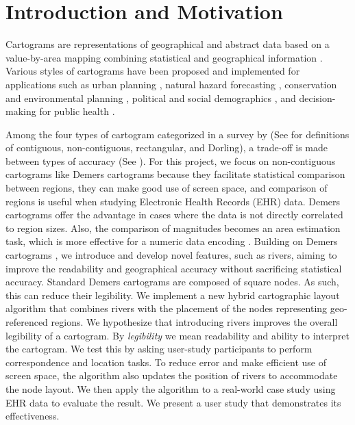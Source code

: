 \section{Introduction and Motivation}

Cartograms are representations of geographical and abstract data based on a value-by-area mapping combining statistical and geographical information \cite{dent2009Cartography,inoue2011New}. 
Various styles of cartograms have been proposed and implemented for applications such as urban planning \cite{harris2018Mapping, arranz-lopez2021Enduser}, natural hazard forecasting \cite{pappenberger2019Cartograms, park2020Flood}, conservation and environmental planning \cite{galluzzi2018Mapping, rocchini2019Cartogramming}, political and social demographics \cite{breitzman2018Using, alieva2021How}, and decision-making for public health \cite{gao2020Visualising, sack2021Visualizing}.

Among the four types of cartogram categorized in a survey by  (See  for definitions of contiguous, non-contiguous, rectangular, and Dorling), a trade-off is made between types of accuracy (See ).
For this project, we focus on non-contiguous cartograms like Demers cartograms because they facilitate statistical comparison between regions, they can make good use of screen space, and comparison of regions is useful when studying Electronic Health Records (EHR) data.
Demers cartograms offer the advantage in cases where the data is not directly correlated to region sizes. Also, the comparison of magnitudes becomes an area estimation task, which is more effective for a numeric data encoding \cite{munzner2014Visualization}.
Building on Demers cartograms \cite{ian2002Cartogram}, we introduce and develop novel features, such as rivers, aiming to improve the readability and geographical accuracy without sacrificing statistical accuracy.
Standard Demers cartograms are composed of square nodes. As such, this can reduce their legibility.
We implement a new hybrid cartographic layout algorithm that combines rivers with the placement of the nodes representing geo-referenced regions. 
We hypothesize that introducing rivers improves the overall legibility of a cartogram. 
By \textit{legibility} we mean readability and ability to interpret the cartogram.  
We test this by asking user-study participants to perform correspondence and location tasks.
To reduce error and make efficient use of screen space, the algorithm also updates the position of rivers to accommodate the node layout.
We then apply the algorithm to a real-world case study using EHR data to evaluate the result.
We present a user study that demonstrates its effectiveness.


